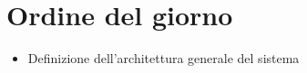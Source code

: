 \section{Ordine del giorno}

\begin{itemize}
    \item Definizione dell'architettura generale del sistema
\end{itemize}